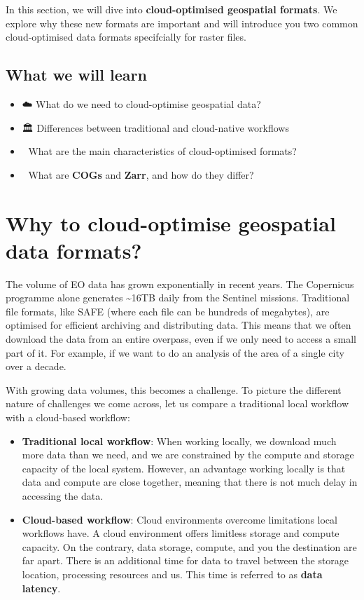 \documentclass[
  letterpaper,
  DIV=11,
  numbers=noendperiod]{scrreprt}
\providecommand{\tightlist}{%
  \setlength{\itemsep}{0pt}\setlength{\parskip}{0pt}}
\begin{document}
In this section, we will dive into \textbf{cloud-optimised geospatial
formats}. We explore why these new formats are important and will
introduce you two common cloud-optimised data formats specifcially for
raster files.

\subsection{What we will learn}\label{what-we-will-learn}

\begin{itemize}
\tightlist
\item
  ☁️ What do we need to cloud-optimise geospatial data?
\item
  🏛️ Differences between traditional and cloud-native workflows
\item
  📖 What are the main characteristics of cloud-optimised formats?
\item
  💾 What are \textbf{COGs} and \textbf{Zarr}, and how do they differ?
\end{itemize}

\section{Why to cloud-optimise geospatial data
formats?}\label{why-to-cloud-optimise-geospatial-data-formats}

The volume of EO data has grown exponentially in recent years. The
Copernicus programme alone generates \textasciitilde16TB daily from the
Sentinel missions. Traditional file formats, like SAFE (where each file
can be hundreds of megabytes), are optimised for efficient archiving and
distributing data. This means that we often download the data from an
entire overpass, even if we only need to access a small part of it. For
example, if we want to do an analysis of the area of a single city over
a decade.

With growing data volumes, this becomes a challenge. To picture the
different nature of challenges we come across, let us compare a
traditional local workflow with a cloud-based workflow:

\begin{itemize}
\item
  \textbf{Traditional local workflow}: When working locally, we download
  much more data than we need, and we are constrained by the compute and
  storage capacity of the local system. However, an advantage working
  locally is that data and compute are close together, meaning that
  there is not much delay in accessing the data.
\item
  \textbf{Cloud-based workflow}: Cloud environments overcome limitations
  local workflows have. A cloud environment offers limitless storage and
  compute capacity. On the contrary, data storage, compute, and you the
  destination are far apart. There is an additional time for data to
  travel between the storage location, processing resources and us. This
  time is referred to as \textbf{data latency}.
\end{itemize}
\end{document}
